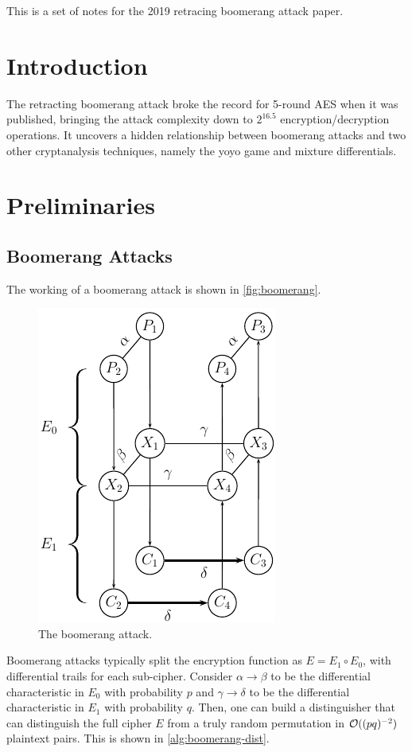 \documentclass[twoside]{article}
\begin{document}



This is a set of notes for the 2019 retracing boomerang attack paper.

\section{Introduction}

The retracting boomerang attack broke the record for 5-round AES when it was
published, bringing the attack complexity down to \(2^{16.5}\)
encryption/decryption operations. It uncovers a hidden relationship between
boomerang attacks and two other cryptanalysis techniques, namely the yoyo game
and mixture differentials.

\section{Preliminaries}

\subsection{Boomerang Attacks}

The working of a boomerang attack is shown in \autoref{fig:boomerang}. 

\begin{figure}[!ht]
    \centering
    \includegraphics[width=0.25\columnwidth]{images/boomerang.png}
    \caption{The boomerang attack.}
    \label{fig:boomerang}
\end{figure}

Boomerang attacks typically split the encryption function as \(E = E_1 \circ
E_0\), with differential trails for each sub-cipher. Consider \(\alpha
\rightarrow \beta\) to be the differential characteristic in \(E_0\) with
probability \(p\) and \(\gamma \rightarrow \delta\) to be the differential
characteristic in \(E_1\) with probability \(q\). Then, one can build a
distinguisher that can distinguish the full cipher \(E\) from a truly random
permutation in \(\mathcal O((pq)^{-2})\) plaintext pairs. This is shown in
\autoref{alg:boomerang-dist}.
\end{document}
